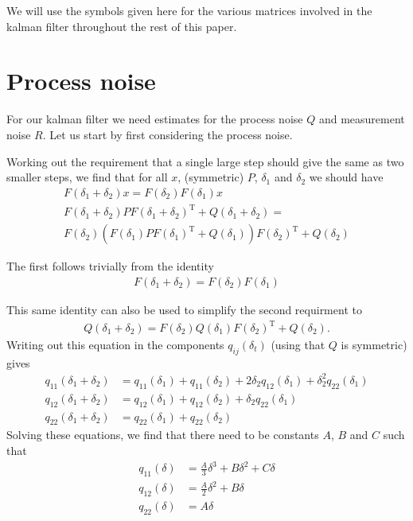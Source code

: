 \documentclass{article}
\begin{document}
We will use the symbols given here for the various matrices involved in the kalman filter throughout the rest of this paper.

\section{Process noise}\label{sec:processnoise}

For our kalman filter we need estimates for the process noise $Q$ and measurement noise $R$. Let us start by first considering the process noise.

Working out the requirement that a single large step should give the same as two smaller steps, we find that for all $x$, (symmetric) $P$, $\delta_1$ and $\delta_2$
we should have
\begin{align}
F(\delta_1 + \delta_2)x = F(\delta_2)F(\delta_1)x\\
F(\delta_1 + \delta_2)PF(\delta_1 + \delta_2)^\mathrm{T} + Q(\delta_1+\delta_2) =\nonumber\\
F(\delta_2)(F(\delta_1)PF(\delta_1)^\mathrm{T} + Q(\delta_1))F(\delta_2)^\mathrm{T} + Q(\delta_2)
\end{align}

The first follows trivially from the identity
\begin{align}
F(\delta_1 + \delta_2) = F(\delta_2)F(\delta_1)
\end{align}

This same identity can also be used to simplify the second requirment to
\begin{align}
Q(\delta_1+\delta_2) = F(\delta_2)Q(\delta_1)F(\delta_2)^\mathrm{T}+Q(\delta_2).
\end{align}
Writing out this equation in the components $q_{ij}(\delta_t)$ (using that $Q$ is symmetric) gives
\begin{align}
q_{11}(\delta_1+\delta_2) &= q_{11}(\delta_1) + q_{11}(\delta_2) + 2\delta_2q_{12}(\delta_1)+\delta_2^2q_{22}(\delta_1)\\
q_{12}(\delta_1+\delta_2) &= q_{12}(\delta_1) + q_{12}(\delta_2) + \delta_2q_{22}(\delta_1)\\
q_{22}(\delta_1+\delta_2) &= q_{22}(\delta_1) + q_{22}(\delta_2)
\end{align}
Solving these equations, we find that there need to be constants $A$, $B$ and $C$ such that 
\begin{align}
q_{11}(\delta) &= \frac{A}{3}\delta^3 + B\delta^2 + C\delta\\
q_{12}(\delta) &= \frac{A}{2}\delta^2 + B\delta\\
q_{22}(\delta) &= A\delta
\end{align}
\end{document}
